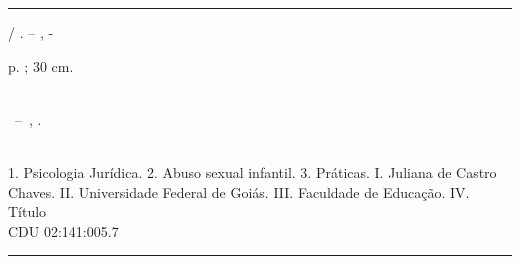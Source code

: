 \documentclass[12pt,oneside,a4paper,english,french,spanish]{abntex2}
\begin{document}
\frenchspacing 


\imprimircapa
\imprimirfolhaderosto*


%
%     
\begin{fichacatalografica}
	\vspace*{\fill}					%
	\hrule							%
	\begin{center}					%
	\begin{minipage}[c]{12.5cm}		%
	
	\imprimirautor
	
	\hspace{0.5cm} \imprimirtitulo  / \imprimirautor. --
	\imprimirlocal, \imprimirdata-
	
	\hspace{0.5cm} \pageref{LastPage} p. ; 30 cm.\\
	
	\hspace{0.5cm} \imprimirorientadorRotulo~\imprimirorientador\\
	
	\hspace{0.5cm}
	\parbox[t]{\textwidth}{\imprimirtipotrabalho~--~\imprimirinstituicao,
	\imprimirdata.}\\
	
	\hspace{0.5cm}
		1. Psicologia Jurídica.
		2. Abuso sexual infantil.
    3. Práticas.
		I. Juliana de Castro Chaves.
		II. Universidade Federal de Goiás.
		III. Faculdade de Educação.
		IV. Título\\
	
	\hspace{8.75cm} CDU 02:141:005.7\\
	
	\end{minipage}
	\end{center}
	\hrule
\end{fichacatalografica}
\end{document}
